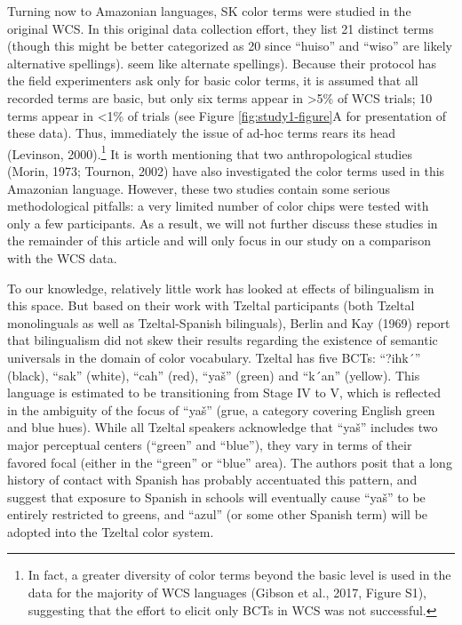 \documentclass[
  english,
  ,man,floatsintext]{apa6}
\begin{document}
Turning now to Amazonian languages, SK color terms were studied in the original WCS. In this original data collection effort, they list 21 distinct terms (though this might be better categorized as 20 since \enquote{huiso} and \enquote{wiso} are likely alternative spellings). seem like alternate spellings). Because their protocol has the field experimenters ask only for basic color terms, it is assumed that all recorded terms are basic, but only six terms appear in \textgreater5\% of WCS trials; 10 terms appear in \textless1\% of trials (see Figure \ref{fig:study1-figure}A for presentation of these data). Thus, immediately the issue of ad-hoc terms rears its head (Levinson, 2000).\footnote{In fact, a greater diversity of color terms beyond the basic level is used in the data for the majority of WCS languages (Gibson et al., 2017, Figure S1), suggesting that the effort to elicit only BCTs in WCS was not successful.} It is worth mentioning that two anthropological studies (Morin, 1973; Tournon, 2002) have also investigated the color terms used in this Amazonian language. However, these two studies contain some serious methodological pitfalls: a very limited number of color chips were tested with only a few participants. As a result, we will not further discuss these studies in the remainder of this article and will only focus in our study on a comparison with the WCS data.

To our knowledge, relatively little work has looked at effects of bilingualism in this space. But based on their work with Tzeltal participants (both Tzeltal monolinguals as well as Tzeltal-Spanish bilinguals), Berlin and Kay (1969) report that bilingualism did not skew their results regarding the existence of semantic universals in the domain of color vocabulary. Tzeltal has five BCTs: \enquote{?ihk´} (black), \enquote{sak} (white), \enquote{cah} (red), \enquote{yaš} (green) and \enquote{k´an} (yellow). This language is estimated to be transitioning from Stage IV to V, which is reflected in the ambiguity of the focus of \enquote{yaš} (grue, a category covering English green and blue hues). While all Tzeltal speakers acknowledge that \enquote{yaš} includes two major perceptual centers (\enquote{green} and \enquote{blue}), they vary in terms of their favored focal (either in the \enquote{green} or \enquote{blue} area). The authors posit that a long history of contact with Spanish has probably accentuated this pattern, and suggest that exposure to Spanish in schools will eventually cause \enquote{yaš} to be entirely restricted to greens, and \enquote{azul} (or some other Spanish term) will be adopted into the Tzeltal color system.
\end{document}
